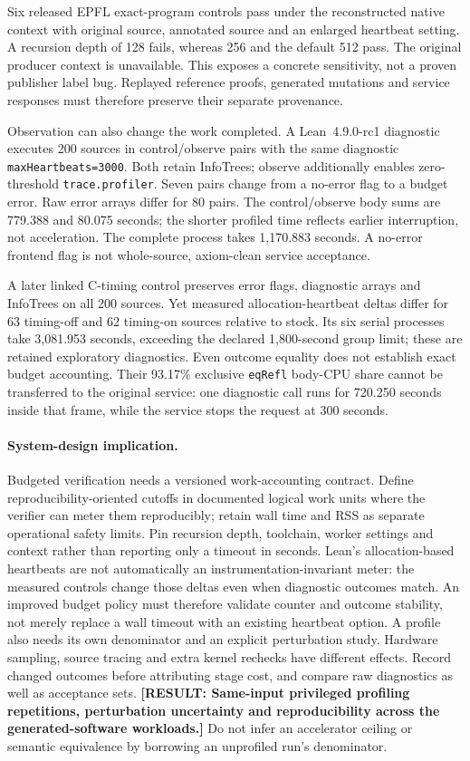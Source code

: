 \documentclass[10pt,twocolumn]{article}
\newcommand{\missing}[1]{\textbf{[RESULT: #1]}}
\begin{document}
Six released EPFL exact-program controls pass under the reconstructed
native context with original source, annotated source and an enlarged
heartbeat setting. A recursion depth of 128 fails, whereas 256 and the
default 512 pass. The original producer context is unavailable.
This exposes a concrete sensitivity, not a proven publisher label bug.
Replayed reference proofs, generated mutations and service responses must
therefore preserve their separate provenance.

Observation can also change the work completed.
A Lean~4.9.0-rc1 diagnostic executes 200 sources in control/observe pairs
with the same diagnostic \texttt{maxHeartbeats=3000}.
Both retain InfoTrees; observe additionally enables zero-threshold
\texttt{trace.profiler}. Seven pairs change from a no-error flag to a
budget error. Raw error arrays differ for 80 pairs.
The control/observe body sums are 779.388 and 80.075 seconds; the shorter
profiled time reflects earlier interruption, not acceleration.
The complete process takes 1,170.883 seconds.
A no-error frontend flag is not whole-source, axiom-clean service acceptance.

A later linked C-timing control preserves error flags, diagnostic arrays
and InfoTrees on all 200 sources. Yet measured allocation-heartbeat deltas
differ for 63 timing-off and 62 timing-on sources relative to stock.
Its six serial processes take 3,081.953 seconds, exceeding the declared
1,800-second group limit; these are retained exploratory diagnostics.
Even outcome equality does not establish exact budget accounting.
Their 93.17\% exclusive \texttt{eqRefl} body-CPU share cannot be transferred
to the original service: one diagnostic call runs for 720.250 seconds
inside that frame, while the service stops the request at 300 seconds.

\paragraph{System-design implication.}
Budgeted verification needs a versioned work-accounting contract.
Define reproducibility-oriented cutoffs in documented logical work units
where the verifier can meter them reproducibly; retain wall time and RSS as
separate operational safety limits. Pin recursion depth, toolchain, worker
settings and context rather than reporting only a timeout in seconds.
Lean's allocation-based heartbeats are not automatically an
instrumentation-invariant meter: the measured controls change those deltas
even when diagnostic outcomes match. An improved budget policy must
therefore validate counter and outcome stability, not merely replace a wall
timeout with an existing heartbeat option.
A profile also needs its own denominator and an explicit perturbation study.
Hardware sampling, source tracing and extra kernel rechecks have different
effects. Record changed outcomes before attributing stage cost, and compare
raw diagnostics as well as acceptance sets.
\missing{Same-input privileged profiling repetitions, perturbation
uncertainty and reproducibility across the generated-software workloads.}
Do not infer an accelerator ceiling or semantic equivalence by borrowing an
unprofiled run's denominator.
\end{document}
